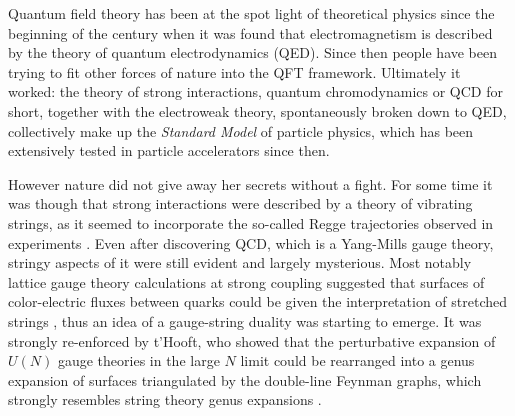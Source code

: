 Quantum field theory has been at the spot light of theoretical physics since the beginning of the century when it was found that electromagnetism is described by the theory of quantum electrodynamics (QED). Since then people have been trying to fit other forces of nature into the QFT framework. 
Ultimately it worked: the theory of strong interactions, quantum chromodynamics or QCD for short, together with the electroweak theory, spontaneously broken down to QED, collectively make up the \emph{Standard Model} of particle physics, which has been extensively tested in particle accelerators since then. 

However nature did not give away her secrets without a fight. 
For some time it was though that strong interactions were described by a theory of vibrating strings, as it seemed to incorporate the so-called Regge trajectories observed in experiments \cite{Veneziano:1968}. 
Even after discovering QCD, which is a Yang-Mills gauge theory, stringy aspects of it were still evident and largely mysterious. 
Most notably lattice gauge theory calculations at strong coupling suggested that surfaces of color-electric fluxes between quarks could be given the interpretation of stretched strings \cite{Wilson:1974}, thus an idea of a gauge-string duality was starting to emerge. 
It was strongly re-enforced by t'Hooft, who showed that the perturbative expansion of $U(N)$ gauge theories in the large $N$ limit could be rearranged into a genus expansion of surfaces triangulated by the double-line Feynman graphs, which strongly resembles string theory genus expansions \cite{THooft:1974}.

\vspace{20pt}
\newlength\yearposx
{}
\vspace{20pt}

